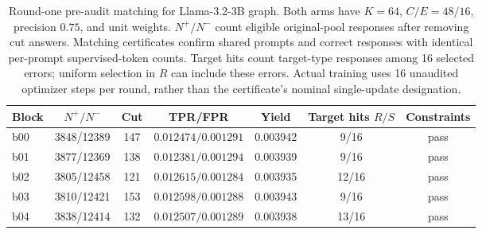 \begin{table}[H]
\caption{Round-one pre-audit matching for Llama-3.2-3B graph. Both arms have $K=64$, $C/E=48/16$, precision $0.75$, and unit weights. $N^+/N^-$ count eligible original-pool responses after removing cut answers. Matching certificates confirm shared prompts and correct responses with identical per-prompt supervised-token counts. Target hits count target-type responses among 16 selected errors; uniform selection in $R$ can include these errors. Actual training uses 16 unaudited optimizer steps per round, rather than the certificate's nominal single-update designation.}
\label{tab:matching}
\centering\small\setlength{\tabcolsep}{4pt}
\begin{tabular}{@{}lcccccc@{}}
\toprule
Block & $N^+/N^-$ & Cut & TPR/FPR & Yield & Target hits $R/S$ & Constraints\\
\midrule
b00 & 3848/12389 & 147 & $0.012474/0.001291$ & 0.003942 & 9/16 & pass\\
b01 & 3877/12369 & 138 & $0.012381/0.001294$ & 0.003939 & 9/16 & pass\\
b02 & 3805/12458 & 121 & $0.012615/0.001284$ & 0.003935 & 12/16 & pass\\
b03 & 3810/12421 & 153 & $0.012598/0.001288$ & 0.003943 & 9/16 & pass\\
b04 & 3838/12414 & 132 & $0.012507/0.001289$ & 0.003938 & 13/16 & pass\\
\bottomrule
\end{tabular}
\end{table}

